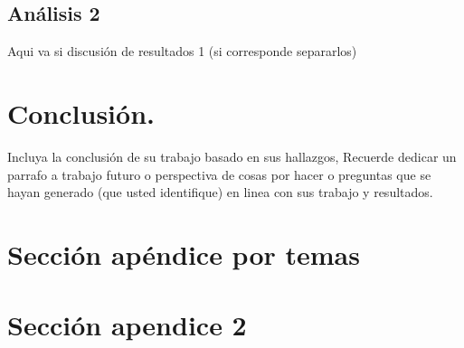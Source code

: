 \documentclass[12pt,fleqn]{article} %
\numberwithin{equation}{section}
\begin{document}
        \subsection{An\'alisis 2}
Aqui va si discusi\'on de resultados 1 (si corresponde separarlos) 

    \section{Conclusi\'on.}
Incluya la conclusi\'on de su trabajo basado en sus hallazgos, Recuerde dedicar un parrafo a trabajo futuro o perspectiva de cosas por hacer o preguntas que se hayan generado (que usted identifique) en linea con sus trabajo y resultados.
\pagebreak

\printbibliography[title={Bibliograf\'ia}]

\pagebreak
    
    \appendix
        \section{Secci\'on ap\'endice por temas}
\pagebreak

\section{Secci\'on apendice 2}
\end{document}
